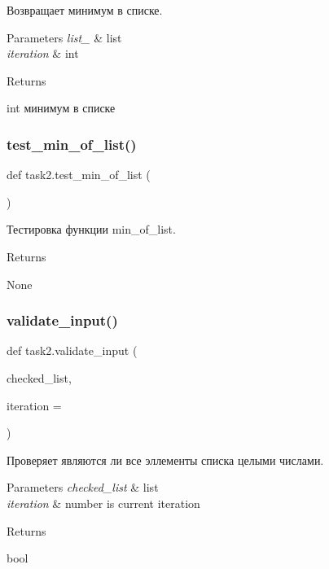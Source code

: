 Возвращает минимум в списке. 


\begin{DoxyParams}{Parameters}
{\em list\+\_\+} & list \\
\hline
{\em iteration} & int\\
\hline
\end{DoxyParams}
\begin{DoxyReturn}{Returns}


int минимум в списке 
\end{DoxyReturn}
\mbox{\label{namespacetask2_a5ea140dcff089ff5c1e696f2fccf7a9f}} 
\subsubsection{\texorpdfstring{test\+\_\+min\+\_\+of\+\_\+list()}{test\_min\_of\_list()}}
{\footnotesize\ttfamily def task2.\+test\+\_\+min\+\_\+of\+\_\+list (\begin{DoxyParamCaption}{ }\end{DoxyParamCaption})}



Тестировка функции min\+\_\+of\+\_\+list. 

\begin{DoxyReturn}{Returns}


None 
\end{DoxyReturn}
\mbox{\label{namespacetask2_a3f18d2aefc4e2184c56e9832bcb27b88}} 
\subsubsection{\texorpdfstring{validate\+\_\+input()}{validate\_input()}}
{\footnotesize\ttfamily def task2.\+validate\+\_\+input (\begin{DoxyParamCaption}\item[{}]{checked\+\_\+list,  }\item[{}]{iteration = {} }\end{DoxyParamCaption})}



Проверяет являются ли все эллементы списка целыми числами. 


\begin{DoxyParams}{Parameters}
{\em checked\+\_\+list} & list \\
\hline
{\em iteration} & number is current iteration\\
\hline
\end{DoxyParams}
\begin{DoxyReturn}{Returns}


bool 
\end{DoxyReturn}
